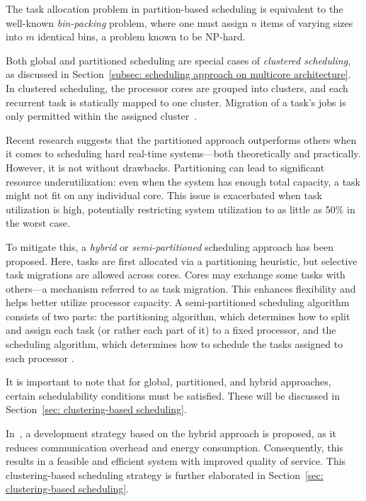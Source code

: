 \documentclass[conference]{IEEEtran}
\begin{document}
The task allocation problem in partition-based scheduling is equivalent to the well-known \textit{bin-packing} problem, where one must assign $n$ items of varying sizes into $m$ identical bins, a problem known to be NP-hard.

Both global and partitioned scheduling are special cases of \textit{clustered scheduling}, as discussed in Section~\ref{subsec: scheduling approach on multicore architecture}. In clustered scheduling, the processor cores are grouped into clusters, and each recurrent task is statically mapped to one cluster. Migration of a task’s jobs is only permitted within the assigned cluster~\cite{sbmbgb}.

Recent research suggests that the partitioned approach outperforms others when it comes to scheduling hard real-time systems—both theoretically and practically. However, it is not without drawbacks. Partitioning can lead to significant resource underutilization: even when the system has enough total capacity, a task might not fit on any individual core. This issue is exacerbated when task utilization is high, potentially restricting system utilization to as little as 50\% in the worst case.

To mitigate this, a \textit{hybrid} or \textit{semi-partitioned} scheduling approach has been proposed. Here, tasks are first allocated via a partitioning heuristic, but selective task migrations are allowed across cores. Cores may exchange some tasks with others—a mechanism referred to as task migration. This enhances flexibility and helps better utilize processor capacity. A semi-partitioned scheduling algorithm consists of two parts: the partitioning algorithm, which determines how to split and assign each task (or rather each part of it) to a fixed processor, and the scheduling algorithm, which determines how to schedule the tasks assigned to each processor \cite{5953668}.



It is important to note that for global, partitioned, and hybrid approaches, certain schedulability conditions must be satisfied. These will be discussed in Section~\ref{sec: clustering-based scheduling}.

In~\cite{AbdallahGB24}, a development strategy based on the hybrid approach is proposed, as it reduces communication overhead and energy consumption. Consequently, this results in a feasible and efficient system with improved quality of service. This clustering-based scheduling strategy is further elaborated in Section~\ref{sec: clustering-based scheduling}.
\end{document}
